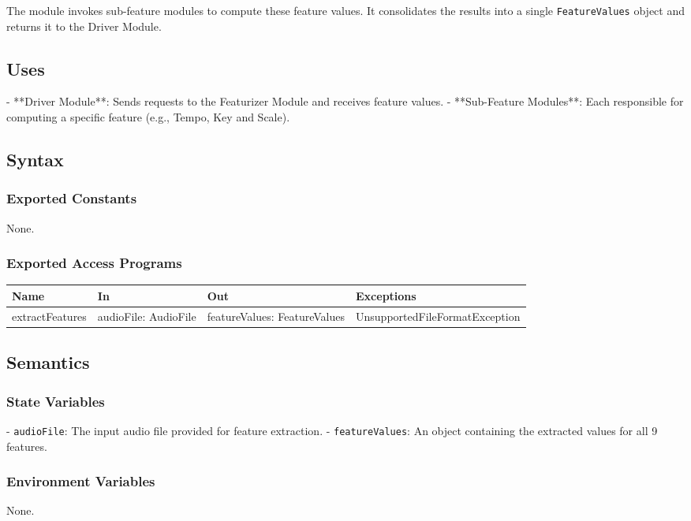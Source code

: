 \documentclass[12pt, titlepage]{article}
\begin{document}
The module invokes sub-feature modules to compute these feature values. It consolidates the results into a single \texttt{FeatureValues} object and returns it to the Driver Module.

\subsection{Uses}
- **Driver Module**: Sends requests to the Featurizer Module and receives feature values.
- **Sub-Feature Modules**: Each responsible for computing a specific feature (e.g., Tempo, Key and Scale).

\subsection{Syntax}

\subsubsection{Exported Constants}
None.

\subsubsection{Exported Access Programs}

\begin{center}
\begin{tabular}{p{2cm} p{4cm} p{4cm} p{2cm}}
\hline
\textbf{Name} & \textbf{In} & \textbf{Out} & \textbf{Exceptions}\\
\hline
extractFeatures & audioFile: AudioFile & featureValues: FeatureValues & UnsupportedFileFormatException \\
\hline
\end{tabular}
\end{center}

\subsection{Semantics}

\subsubsection{State Variables}
- \texttt{audioFile}: The input audio file provided for feature extraction.
- \texttt{featureValues}: An object containing the extracted values for all 9 features.

\subsubsection{Environment Variables}
None.
\end{document}
